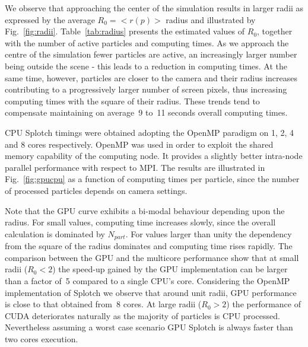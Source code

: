 \documentclass[preprint,5pt]{elsarticle}
\begin{document}
We observe that approaching the center of the simulation results in larger radii 
as expressed by the average $R_0=<r(p)>$ radius and illustrated by Fig.~\ref{fig:radii}. 
Table~\ref{tab:radius} presents the estimated values of $R_0$, together with the number of active particles and computing times. As we approach the centre of the simulation fewer particles are active, an increasingly larger 
number being outside the scene - this leads to a reduction in computing times. At the same
time, however, particles are closer to the camera and their radius increases contributing to 
a progressively larger number of screen pixels,
thus increasing computing times with the square of their radius. 
These trends tend to compensate maintaining on average~9 to~11 seconds overall computing times.

CPU Splotch timings were obtained adopting the OpenMP paradigm on 1, 2, 4 and 8 cores respectively. OpenMP was used in order to exploit the shared memory capability of the computing node. It provides a slightly better intra-node parallel performance with respect to MPI. The results are illustrated in Fig.~\ref{fig:gpucpu} as a function of computing times per particle, since the number of processed particles depends on camera settings.

Note that the GPU curve exhibits a bi-modal behaviour depending upon the radius. For small values, computing time increases slowly, since the overall calculation is dominated by $N_{part}$. For values larger than unity the dependency from the square of the radius dominates and computing time rises rapidly. The comparison between the GPU and the multicore performance show that at small radii ($R_0 < 2$) the speed-up gained by the GPU implementation can be larger than a factor of~5 compared to a single CPU's core. Considering the OpenMP implementation of Splotch we observe that around unit radii, GPU performance is close to that obtained from~8 cores. At large radii ($R_0 > 2$) the performance of CUDA deteriorates naturally as the majority of particles is CPU processed. Nevertheless assuming a worst case scenario GPU Splotch is always faster than two cores execution. 
\end{document}
